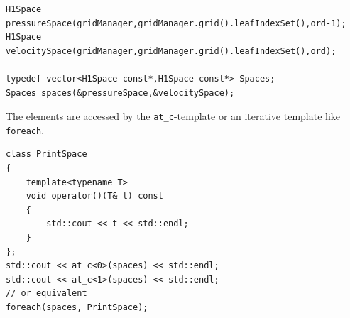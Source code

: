 \documentclass[11pt]{article}
\begin{document}
\begin{lstlisting}
H1Space pressureSpace(gridManager,gridManager.grid().leafIndexSet(),ord-1);
H1Space velocitySpace(gridManager,gridManager.grid().leafIndexSet(),ord);

typedef vector<H1Space const*,H1Space const*> Spaces;
Spaces spaces(&pressureSpace,&velocitySpace);
\end{lstlisting}

The elements are accessed by the {\tt at\_c}-template or an iterative template like {\tt foreach}.\\

\begin{lstlisting}
class PrintSpace
{
    template<typename T>
    void operator()(T& t) const
    {
        std::cout << t << std::endl;
    }
};
std::cout << at_c<0>(spaces) << std::endl;
std::cout << at_c<1>(spaces) << std::endl;
// or equivalent
foreach(spaces, PrintSpace);
\end{lstlisting}
\end{document}
